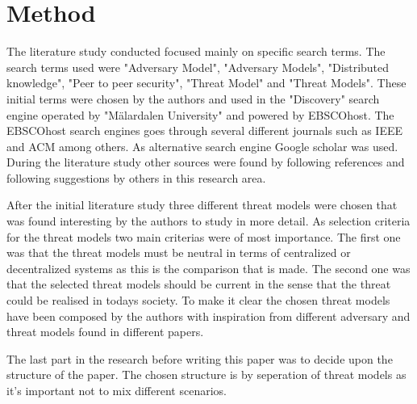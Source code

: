 \section{Method}
The literature study conducted focused mainly on specific search terms. The search terms used were "Adversary Model", "Adversary Models", "Distributed knowledge", "Peer to peer security", "Threat Model" and "Threat Models".
These initial terms were chosen by the authors and used in the "Discovery" search engine operated by "M\"{a}lardalen University" and powered by EBSCOhost.
The EBSCOhost search engines goes through several different journals such as IEEE and ACM among others.
As alternative search engine Google scholar was used.
During the literature study other sources were found by following references and following suggestions by others in this research area.

After the initial literature study three different threat models were chosen that was found interesting by the authors to study in more detail.
As selection criteria for the threat models two main criterias were of most importance. 
The first one was that the threat models must be neutral in terms of centralized or decentralized systems as this is the comparison that is made.
The second one was that the selected threat models should be current in the sense that the threat could be realised in todays society.
To make it clear the chosen threat models have been composed by the authors with inspiration from different adversary and threat models found in different papers.

The last part in the research before writing this paper was to decide upon the structure of the paper. The chosen structure is by seperation of threat models as it's important not to mix different scenarios.
